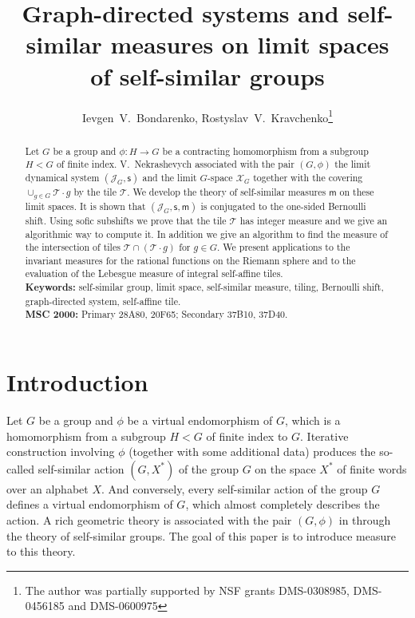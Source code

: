 \documentclass[12pt]{article}
\author{Ievgen~V.~Bondarenko, Rostyslav~V.~Kravchenko\thanks{The author was partially supported by NSF grants
DMS-0308985, DMS-0456185 and DMS-0600975}}
\title{\textbf{Graph-directed systems and self-similar measures on limit spaces\\ of self-similar groups}}
\newcommand{\limGs}[1][G]{\mathcal{X}_{#1}}
\newcommand{\lims}[1][G]{\mathscr{J}_{#1}}
\newcommand{\si}{\mathsf{s}}
\newcommand{\muls}{\mathsf{m}}
\newcommand{\tile}{\mathscr{T}}
\theoremstyle{definition}
\begin{document}
\maketitle

\begin{abstract}
Let $G$ be a group and $\phi:H\rightarrow G$ be a contracting homomorphism from a subgroup $H<G$ of
finite index. V.~Nekrashevych \cite{self_sim_groups} associated with the pair $(G,\phi)$ the limit
dynamical system $(\lims,\si)$ and the limit $G$-space $\limGs$ together with the covering
$\cup_{g\in G}\tile\cdot g$ by the tile $\tile$. We develop the theory of self-similar measures
$\muls$ on these limit spaces. It is shown that $(\lims,\si,\muls)$ is conjugated to the one-sided
Bernoulli shift. Using sofic subshifts we prove that the tile $\tile$ has integer measure and we
give an algorithmic way to compute it. In addition we give an algorithm to find the measure of the
intersection of tiles $\tile\cap (\tile\cdot g)$ for $g\in G$. We present applications to the
invariant measures for the rational functions on the Riemann sphere and to the evaluation of the
Lebesgue measure of integral self-affine tiles.\\

\noindent \textbf{Keywords:} self-similar group, limit space, self-similar measure, tiling,
Bernoulli shift, graph-directed system, self-affine tile.\\


\noindent \textbf{MSC 2000:} Primary 28A80, 20F65; Secondary 37B10, 37D40.\\
\end{abstract}












\section{Introduction}

Let $G$ be a group and $\phi$ be a virtual endomorphism of $G$, which is a homomorphism from a
subgroup $H<G$ of finite index to $G$. Iterative construction involving $\phi$ (together with some
additional data) produces the so-called self-similar action $(G,X^{*})$ of the group $G$ on the
space $X^{*}$ of finite words over an alphabet $X$. And conversely, every self-similar action of
the group $G$ defines a virtual endomorphism of $G$, which almost completely describes the action.
A rich geometric theory is associated with the pair $(G,\phi)$ in \cite{self_sim_groups} through
the theory of self-similar groups. The goal of this paper is to introduce measure to this theory.
\end{document}
